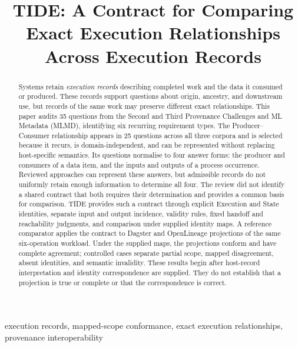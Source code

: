 \documentclass[conference]{IEEEtran}
\title{TIDE: A Contract for Comparing Exact Execution Relationships Across Execution Records}
\author{\IEEEauthorblockN{Gabriel Dolbear}
\IEEEauthorblockA{Independent Researcher\\\href{mailto:gabrieldolbear@gmail.com}{gabrieldolbear@gmail.com}}}
\theoremstyle{tideproposition}
\begin{document}
\maketitle

\setlength{\abovedisplayskip}{0.9ex plus 2pt minus 1pt}
\setlength{\belowdisplayskip}{0.9ex plus 2pt minus 1pt}
\setlength{\abovedisplayshortskip}{0pt plus 2pt}
\setlength{\belowdisplayshortskip}{0.9ex plus 2pt minus 1pt}

\begin{abstract}
Systems retain \emph{execution records} describing completed work and the data it consumed or produced. These records support questions about origin, ancestry, and downstream use, but records of the same work may preserve different exact relationships. This paper audits 35 questions from the Second and Third Provenance Challenges and ML Metadata (MLMD), identifying six recurring requirement types. The Producer--Consumer relationship appears in 25 questions across all three corpora and is selected because it recurs, is domain-independent, and can be represented without replacing host-specific semantics. Its questions normalise to four answer forms: the producer and consumers of a data item, and the inputs and outputs of a process occurrence. Reviewed approaches can represent these answers, but admissible records do not uniformly retain enough information to determine all four. The review did not identify a shared contract that both requires their determination and provides a common basis for comparison. TIDE provides such a contract through explicit Execution and State identities, separate input and output incidence, validity rules, fixed handoff and reachability judgments, and comparison under supplied identity maps. A reference comparator applies the contract to Dagster and OpenLineage projections of the same six-operation workload. Under the supplied maps, the projections conform and have complete agreement; controlled cases separate partial scope, mapped disagreement, absent identities, and semantic invalidity. These results begin after host-record interpretation and identity correspondence are supplied. They do not establish that a projection is true or complete or that the correspondence is correct.
\end{abstract}

\begin{IEEEkeywords}
execution records, mapped-scope conformance, exact execution relationships, provenance interoperability
\end{IEEEkeywords}
\end{document}
